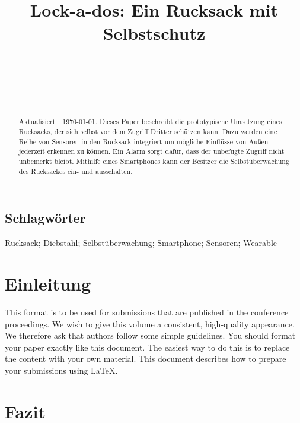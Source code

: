 \documentclass{sigchi}
\def\plaintitle{Lock-a-dos: Ein Rucksack mit Selbstschutz}
\def\plainkeywords{Rucksack; Diebstahl; Selbstüberwachung; Smartphone; Sensoren; Wearable}
\begin{document}
\title{\plaintitle}

\author{%
  \\
  \\
  \\
  \\
}

\maketitle

\begin{abstract}
  Aktualisiert---\today. Dieses Paper beschreibt die prototypische
  Umsetzung eines Rucksacks, der sich selbst vor dem Zugriff Dritter
  schützen kann. Dazu werden eine Reihe von Sensoren in den Rucksack
  integriert um mögliche Einflüsse von Außen jederzeit erkennen zu
  können. Ein Alarm sorgt dafür, dass der unbefugte Zugriff nicht
  unbemerkt bleibt. Mithilfe eines Smartphones kann der Besitzer
  die Selbstüberwachung des Rucksackes ein- und ausschalten.
\end{abstract}

\subsection{Schlagwörter}
\plainkeywords

\section{Einleitung}

This format is to be used for submissions that are published in the
conference proceedings. We wish to give this volume a consistent,
high-quality appearance. We therefore ask that authors follow some
simple guidelines. You should format your paper exactly like this
document. The easiest way to do this is to replace the content with
your own material.  This document describes how to prepare your
submissions using \LaTeX.

\section{Fazit}
\end{document}
